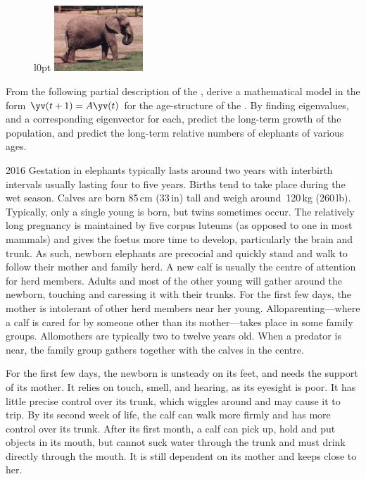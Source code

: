 \begin{exercise}  
\begin{figure}l{0pt}
\includegraphics[width=9em]{EigGen/africanElephant}
\end{figure}
From the following partial description of the , 
derive a mathematical model in the form \(\yv(t+1)=A\yv(t)\) for the age-structure of the .
By finding eigenvalues, and a corresponding eigenvector for each, predict the long-term growth of the population, and predict the long-term relative numbers of elephants of various ages.

\begin{quoted}{ 2016 \cite[]{Sukumar2003}}
Gestation in elephants typically lasts around two years with interbirth intervals usually lasting four to five years. Births tend to take place during the wet season. Calves are born 85\,cm (33\,in) tall and weigh around~120\,kg (260\,lb). Typically, only a single young is born, but twins sometimes occur.  The relatively long pregnancy is maintained by five corpus luteums (as opposed to one in most mammals) and gives the foetus more time to develop, particularly the brain and trunk. As such, newborn elephants are precocial and quickly stand and walk to follow their mother and family herd.  A new calf is usually the centre of attention for herd members.  Adults and most of the other young will gather around the newborn, touching and caressing it with their trunks.  For the first few days, the mother is intolerant of other herd members near her young.  Alloparenting---where a calf is cared for by someone other than its mother---takes place in some family groups.  Allomothers are typically two to twelve years old. When a predator is near, the family group gathers together with the calves in the centre.

For the first few days, the newborn is unsteady on its feet, and needs the support of its mother. It relies on touch, smell, and hearing, as its eyesight is poor. It has little precise control over its trunk, which wiggles around and may cause it to trip. By its second week of life, the calf can walk more firmly and has more control over its trunk. After its first month, a calf can pick up, hold and put objects in its mouth, but cannot suck water through the trunk and must drink directly through the mouth. It is still dependent on its mother and keeps close to her.


\end{quoted}
\end{exercise}

